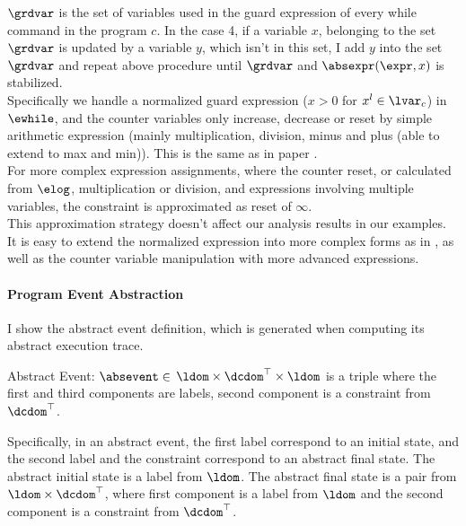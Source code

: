     $\grdvar$ is the set of variables used in the guard expression of every while command in the program $c$. 
  In the case 4, if a variable $x$, belonging to the set 
  $\grdvar$ is updated by a variable $y$, which isn't in this set, 
  I add $y$ into the set $\grdvar$ and repeat 
  above procedure  until $\grdvar$ and $\absexpr(\expr, x)$ is stabilized. 
  \\
Specifically 
we handle a 
normalized guard expression ($ x > 0$ for $x^l \in \lvar_c$)
 in $\ewhile$, and 
the counter variables only increase, decrease or reset by 
simple arithmetic expression (mainly multiplication, division, minus and plus (able to extend to max and min)). 
This is the same as in paper \cite{sinn2017complexity}. 
\\
For more complex expression assignments, where the counter reset, or calculated from $\elog$, 
multiplication or division, and expressions involving multiple variables, the constraint is approximated as reset of $\infty$.
\\
This approximation strategy
doesn't affect our analysis results in our examples. It is easy to extend the normalized expression 
into more complex forms as in \cite{sinn2017complexity}, as well as the 
counter variable manipulation with more advanced expressions.


\paragraph{Program Event Abstraction}
 I show the abstract event definition, which is generated when computing its abstract execution trace.

\begin{defn}
  \label{def:abs_event}
  Abstract Event: 
  $\absevent \in $
  $\ldom \times \dcdom^{\top} \times \ldom$
  is a 
  triple where the first and third components are labels,
  second component is a constraint from $\dcdom^{\top}$.
  \end{defn}
  Specifically, in an abstract event, 
  the first label correspond to an initial state, and 
  the second label and the constraint correspond to an abstract final state.
 The abstract initial state is a label from $\ldom$.
The abstract final state is a pair from $\ldom \times \dcdom^{\top}$,  
where first component is a label from $\ldom$ and the second component is a constraint from $\dcdom^{\top}$.
%

